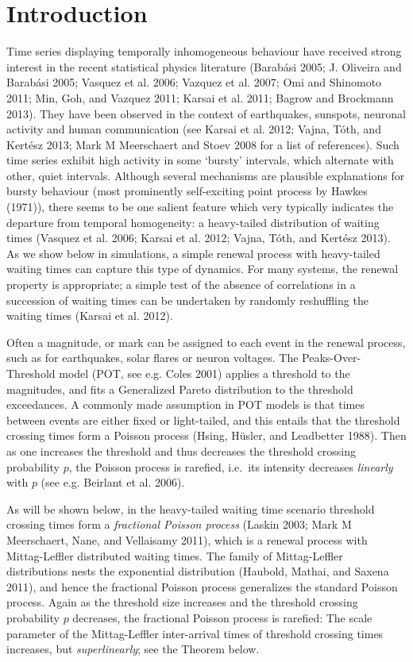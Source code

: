 \documentclass[smallextended]{svjour3}       %
\begin{document}
\def\spacingset#1{\renewcommand{\baselinestretch}%
{#1}\small\normalsize} \spacingset{1}


\section{Introduction}\label{introduction}

Time series displaying temporally inhomogeneous behaviour have received
strong interest in the recent statistical physics literature (Barabási
2005; J. Oliveira and Barabási 2005; Vasquez et al. 2006; Vazquez et al.
2007; Omi and Shinomoto 2011; Min, Goh, and Vazquez 2011; Karsai et al.
2011; Bagrow and Brockmann 2013). They have been observed in the context
of earthquakes, sunspots, neuronal activity and human communication (see
Karsai et al. 2012; Vajna, Tóth, and Kertész 2013; Mark M Meerschaert
and Stoev 2008 for a list of references). Such time series exhibit high
activity in some `bursty' intervals, which alternate with other, quiet
intervals. Although several mechanisms are plausible explanations for
bursty behaviour (most prominently self-exciting point process by Hawkes
(1971)), there seems to be one salient feature which very typically
indicates the departure from temporal homogeneity: a heavy-tailed
distribution of waiting times (Vasquez et al. 2006; Karsai et al. 2012;
Vajna, Tóth, and Kertész 2013). As we show below in simulations, a
simple renewal process with heavy-tailed waiting times can capture this
type of dynamics. For many systems, the renewal property is appropriate;
a simple test of the absence of correlations in a succession of waiting
times can be undertaken by randomly reshuffling the waiting times
(Karsai et al. 2012).

Often a magnitude, or mark can be assigned to each event in the renewal
process, such as for earthquakes, solar flares or neuron voltages. The
Peaks-Over-Threshold model (POT, see e.g. Coles 2001) applies a
threshold to the magnitudes, and fits a Generalized Pareto distribution
to the threshold exceedances. A commonly made assumption in POT models
is that times between events are either fixed or light-tailed, and this
entails that the threshold crossing times form a Poisson process (Hsing,
Hüsler, and Leadbetter 1988). Then as one increases the threshold and
thus decreases the threshold crossing probability \(p\), the Poisson
process is rarefied, i.e.~its intensity decreases \emph{linearly} with
\(p\) (see e.g. Beirlant et al. 2006).

As will be shown below, in the heavy-tailed waiting time scenario
threshold crossing times form a \emph{fractional Poisson process}
(Laskin 2003; Mark M Meerschaert, Nane, and Vellaisamy 2011), which is a
renewal process with Mittag-Leffler distributed waiting times. The
family of Mittag-Leffler distributions nests the exponential
distribution (Haubold, Mathai, and Saxena 2011), and hence the
fractional Poisson process generalizes the standard Poisson process.
Again as the threshold size increases and the threshold crossing
probability \(p\) decreases, the fractional Poisson process is rarefied:
The scale parameter of the Mittag-Leffler inter-arrival times of
threshold crossing times increases, but \emph{superlinearly}; see the
Theorem below.
\end{document}
